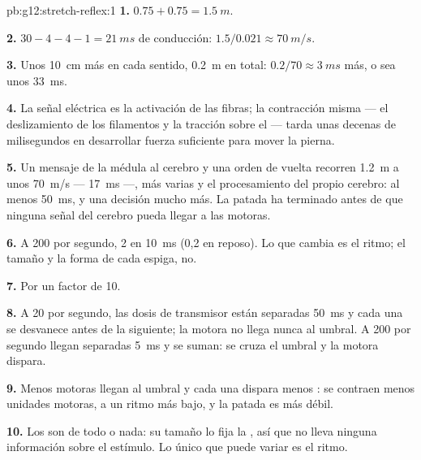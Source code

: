 \begin{solution}{pb:g12:stretch-reflex:1}
\textbf{1.} $0.75 + 0.75 = \qty{1.5}{m}$.

\textbf{2.} $30 - 4 - 4 - 1 = \qty{21}{ms}$ de conducción: $1.5/0.021
\approx \qty{70}{m/s}$.

\textbf{3.} Unos \qty{10}{cm} más en cada sentido, \qty{0.2}{m} en
total: $0.2/70 \approx \qty{3}{ms}$ más, o sea unos \qty{33}{ms}.

\textbf{4.} La señal eléctrica es la activación de las fibras; la
contracción misma --- el deslizamiento de los filamentos y la tracción
sobre el  --- tarda unas decenas de milisegundos en desarrollar
fuerza suficiente para mover la pierna.

\textbf{5.} Un mensaje de la médula al cerebro y una orden de vuelta
recorren \qty{1.2}{m} a unos \qty{70}{m/s} --- \qty{17}{ms} ---, más
varias  y el procesamiento del propio cerebro: al menos
\qty{50}{ms}, y una decisión mucho más. La patada ha terminado antes de
que ninguna señal del cerebro pueda llegar a las  motoras.

\textbf{6.} A 200 por segundo, 2  en \qty{10}{ms}
(0,2 en reposo). Lo que cambia es el ritmo; el tamaño y la forma de
cada espiga, no.

\textbf{7.} Por un factor de 10.

\textbf{8.} A 20 por segundo, las dosis de transmisor están separadas
\qty{50}{ms} y cada una se desvanece antes de la siguiente; la 
motora no llega nunca al umbral. A 200 por segundo llegan separadas
\qty{5}{ms} y se suman: se cruza el umbral y la  motora dispara.

\textbf{9.} Menos  motoras llegan al umbral y cada una dispara
menos : se contraen menos unidades motoras, a un
ritmo más bajo, y la patada es más débil.

\textbf{10.} Los  son de todo o nada: su tamaño lo
fija la , así que no lleva ninguna información sobre el
estímulo. Lo único que puede variar es el ritmo.


\end{solution}
